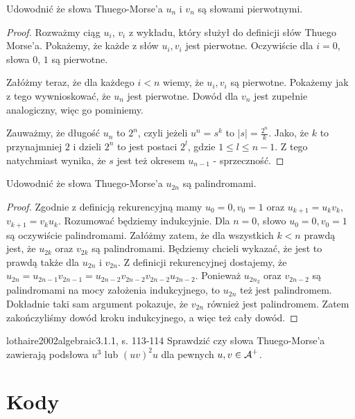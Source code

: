 \begin{problem}{}{}
  Udowodnić że słowa Thuego-Morse'a $u_n$ i $v_n$ są słowami pierwotnymi.
\end{problem}

\begin{proof}
Rozważmy ciąg $u_i$, $v_i$ z wykładu, który służył do definicji słów Thuego Morse'a. Pokażemy, że każde z słów $u_i, v_i$ jest pierwotne.
Oczywiście dla $i=0$, słowa $0$, $1$ są pierwotne.

Załóżmy teraz, że dla każdego $i < n$ wiemy, że $u_i, v_i$ są pierwotne. Pokażemy jak z tego wywnioskować, że $u_n$ jest pierwotne. Dowód dla $v_n$ jest zupełnie analogiczny, więc go pominiemy.

Zauważmy, że długość $u_n$ to $2^n$, czyli jeżeli $u^n = s^k$ to $|s| = \frac{2^n}{k}$. Jako, że $k$ to przynajmniej $2$ i dzieli $2^n$ to jest postaci $2^l$, gdzie $1 \leq l \leq n-1$. Z tego natychmiast wynika, że $s$ jest też okresem $u_{n-1}$ - sprzeczność.
\end{proof}

\begin{problem}{}{}
  Udowodnić że słowa Thuego-Morse'a $u_{2n}$ są palindromami.
\end{problem}

\begin{proof}
Zgodnie z definicją rekurencyjną mamy $u_0=0,v_0=1$ oraz $u_{k+1}=u_kv_k$, $v_{k+1}=v_ku_k$. Rozumować będziemy indukcyjnie. Dla $n=0$, słowo $u_0=0, v_0=1$ są oczywiście palindromami. Załóżmy zatem, że dla wszystkich $k < n$ prawdą jest, że $u_{2k}$ oraz $v_{2k}$ są palindromami. Będziemy chcieli wykazać, że jest to prawdą także dla $u_{2n}$ i $v_{2n}$. Z definicji rekurencyjnej dostajemy, że $u_{2n}=u_{2n-1}v_{2n-1}=u_{2n-2}v_{2n-2}v_{2n-2}u_{2n-2}$. Ponieważ $u_{2n_2}$ oraz $v_{2n-2}$ są palindromami na mocy założenia indukcyjnego, to $u_{2n}$ też jest palindromem. Dokładnie taki sam argument pokazuje, że $v_{2n}$ również jest palindromem. Zatem zakończyliśmy dowód kroku indukcyjnego, a więc też cały dowód.
\end{proof}

\begin{problem}{lothaire2002algebraic}{3.1.1, s. 113-114}
  Sprawdzić czy słowa Thuego-Morse'a zawierają podsłowa $u^3$ lub $(uv)^2u$ dla pewnych $u, v \in \operatorname{\mathcal{A}}^+$.
\end{problem}

\section{Kody}

